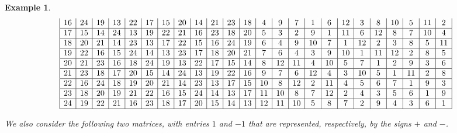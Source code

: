 \documentclass[11pt,a4paper]{article}
\newtheorem{example}[theorem]{Example}
\begin{document}
\begin{example}
{\[\begin{array}{|c|c|c|c|c|c|c|c|c|c|c|c|c|c|c|c|c|c|c|c|c|c|c|c|}
16 & 24 & 19 & 13 & 22 & 17 & 15 & 20 & 14 & 21 & 23 & 18 & 4 & 9 & 7 & 1 & 6 & 12 & 3 & 8 & 10 & 5 & 11 & 2 \\ \hline
17 & 15 & 14 & 24 & 13 & 19 & 22 & 21 & 16 & 23 & 18 & 20 & 5 & 3 & 2 & 9 & 1 & 11 & 6 & 12 & 8 & 7 & 10 & 4 \\ \hline
18 & 20 & 21 & 14 & 23 & 13 & 17 & 22 & 15 & 16 & 24 & 19 & 6 & 4 & 9 & 10 & 7 & 1 & 12 & 2 & 3 & 8 & 5 & 11 \\ \hline
19 & 22 & 16 & 15 & 24 & 14 & 13 & 23 & 17 & 18 & 20 & 21 & 7 & 6 & 4 & 3 & 9 & 10 & 1 & 11 & 12 & 2 & 8 & 5 \\ \hline
20 & 21 & 23 & 16 & 18 & 24 & 19 & 13 & 22 & 17 & 15 & 14 & 8 & 12 & 11 & 4 & 10 & 5 & 7 & 1 & 2 & 9 & 3 & 6 \\ \hline
21 & 23 & 18 & 17 & 20 & 15 & 14 & 24 & 13 & 19 & 22 & 16 & 9 & 7 & 6 & 12 & 4 & 3 & 10 & 5 & 1 & 11 & 2 & 8 \\ \hline
22 & 16 & 24 & 18 & 19 & 20 & 21 & 14 & 23 & 13 & 17 & 15 & 10 & 8 & 12 & 2 & 11 & 4 & 5 & 6 & 7 & 1 & 9 & 3 \\ \hline
23 & 18 & 20 & 19 & 21 & 22 & 16 & 15 & 24 & 14 & 13 & 17 & 11 & 10 & 8 & 7 & 12 & 2 & 4 & 3 & 5 & 6 & 1 & 9 \\ \hline
24 & 19 & 22 & 21 & 16 & 23 & 18 & 17 & 20 & 15 & 14 & 13 & 12 & 11 & 10 & 5 & 8 & 7 & 2 & 9 & 4 & 3 & 6 & 1 \\ \hline
\end{array}\]}

We also consider the following two matrices, with entries $1$ and $-1$ that are represented, respectively, by the signs $+$ and $-$.


\end{example}
\end{document}
